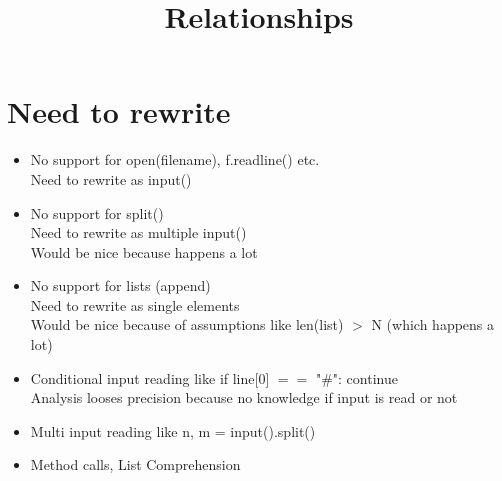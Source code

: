 \documentclass[11pt]{article}
\begin{document}
\title{Relationships}

\maketitle


\section{Need to rewrite}

\begin{itemize}
\item No support for open(filename), f.readline() etc.\\
Need to rewrite as input()
\item No support for split()\\
Need to rewrite as multiple input()\\
Would be nice because happens a lot
\item No support for lists (append)\\
Need to rewrite as single elements\\
Would be nice because of assumptions like len(list) $>$ N (which happens a lot)
\item Conditional input reading like if line[0] $==$ "\#": continue\\
Analysis looses precision because no knowledge if input is read or not
\item Multi input reading like n, m = input().split()
\item Method calls, List Comprehension
\end{itemize}
\end{document}
